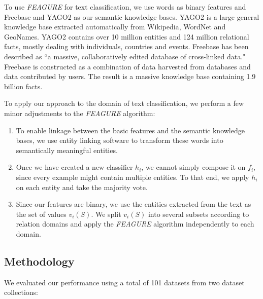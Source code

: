 \documentclass[letterpaper]{article} %
\theoremstyle{definition}
\begin{document}

To use \emph{FEAGURE} for text classification, we use words as binary features and Freebase and YAGO2 as our semantic knowledge bases.
YAGO2 \cite{hoffart2013yago2} is a large general knowledge base extracted automatically from Wikipedia, WordNet and GeoNames.
YAGO2 contains over 10 million entities and 124 million relational facts, mostly dealing with individuals, countries and events.
Freebase \cite{bollacker2008freebase} has been described as ``a massive, collaboratively edited database of cross-linked data." Freebase is constructed as a combination of data harvested from databases and data contributed by users. The result is a massive knowledge base containing 1.9 billion facts. 

To apply our approach to the domain of text classification, we perform a few minor adjustments to the \emph{FEAGURE} algorithm:
\begin{enumerate}
	\item To enable linkage between the basic features and the semantic knowledge bases, we use entity linking software \cite{hoffart2011robust,milne2013open} to transform these words into semantically meaningful entities.
	\item Once we have created a new classifier $h_i$, we cannot simply compose it on $f_i$, since every example might contain multiple entities. To that end,  we apply $h_i$ on each entity and take the majority vote.
	\item Since our features are binary, we use the entities extracted from the text as the set of values $v_i(S)$. We split $v_i(S)$ into several subsets according to relation domains and apply the \emph{FEAGURE} algorithm independently to each domain. 
\end{enumerate}

\subsection{Methodology}

We evaluated our performance using a total of 101 datasets from two dataset collections:
\end{document}
